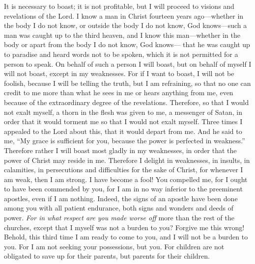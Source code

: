 \begin{biblechapter} %
 It is necessary to boast; it is not profitable, but I will proceed to visions and revelations of the Lord.
\verse I know a man in Christ fourteen years ago—whether in the body I do not know, or outside the body I do not know, God knows—such a man was caught up to the third heaven,
\verse and I know this man—whether in the body or apart from the body I do not know, God knows—
\verse that he was caught up to paradise and heard words not to be spoken, which it is not permitted for a person to speak.
\verse On behalf of such a person I will boast, but on behalf of myself I will not boast, except in my weaknesses.
\verse For if I want to boast, I will not be foolish, because I will be telling the truth, but I am refraining, so that no one can credit to me more than what he sees in me or hears anything from me,
\verse even because of the extraordinary degree of the revelations. Therefore, so that I would not exalt myself, a thorn in the flesh was given to me, a messenger of Satan, in order that it would torment me so that I would not exalt myself.
\verse Three times I appealed to the Lord about this, that it would depart from me.
\verse And he said to me, “My grace is sufficient for you, because the power is perfected in weakness.” Therefore rather I will boast most gladly in my weaknesses, in order that the power of Christ may reside in me.
\verse Therefore I delight in weaknesses, in insults, in calamities, in persecutions and difficulties for the sake of Christ, for whenever I am weak, then I am strong.
 I have become a fool! You compelled me, for I ought to have been commended by you, for I am in no way inferior to the preeminent apostles, even if I am nothing.
\verse Indeed, the signs of an apostle have been done among you with all patient endurance, both signs and wonders and deeds of power.
\verse \textit{For in what respect are you made worse off} more than the rest of the churches, except that I myself was not a burden to you? Forgive me this wrong!
\verse Behold, this third time I am ready to come to you, and I will not be a burden to you. For I am not seeking your possessions, but you. For children are not obligated to save up for their parents, but parents for their children.

\end{biblechapter}
